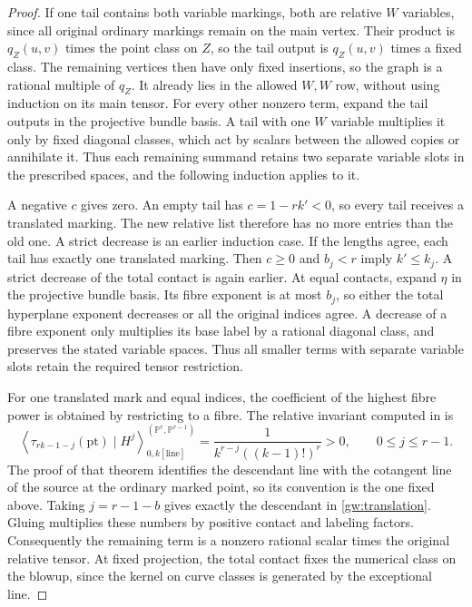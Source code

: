 \begin{proof}
If one tail contains both variable markings, both are relative $W$
variables, since all original ordinary markings remain on the main vertex.
Their product is $q_Z(u,v)$ times the point class on $Z$, so the tail output
is $q_Z(u,v)$ times a fixed class.  The remaining vertices then have only
fixed insertions, so the graph is a rational multiple of $q_Z$.  It already
lies in the allowed $W,W$ row, without using induction on its main tensor.
For every other nonzero term, expand the tail outputs in the projective
bundle basis.  A tail with one $W$ variable multiplies it only by fixed
diagonal classes, which act by scalars between the allowed copies or
annihilate it.  Thus each remaining summand retains two separate variable
slots in the prescribed spaces, and the following induction applies to it.

A negative $c$ gives zero.  An empty tail has $c=1-rk'<0$, so every tail
receives a translated marking.  The new relative list therefore has no
more entries than the old one.  A strict decrease is an earlier induction
case.  If the lengths agree, each tail has exactly one translated marking.
Then $c\geq0$ and $b_j<r$ imply $k'\leq k_j$.  A strict decrease of the
total contact is again earlier.  At equal contacts, expand $\eta$ in the
projective bundle basis.  Its fibre exponent is at most $b_j$, so either
the total hyperplane exponent decreases or all the original indices agree.
A decrease of a fibre exponent only multiplies its base label by a rational
diagonal class, and preserves the stated variable spaces.  Thus all smaller
terms with separate variable slots retain the required tensor
restriction.

For one translated mark and equal indices, the coefficient of the highest
fibre power is obtained by restricting to a fibre.  The relative invariant
computed in \cite[Theorem~7.1]{HLR08} is
\begin{equation}\label{gw:fibre-number}
\left\langle\tau_{rk-1-j}(\mathrm{pt})\mid H^j\right\rangle^%
 { (\mathbb P^r,\mathbb P^{r-1})}_{0,k[\mathrm{line}]}
 =\frac{1}{k^{r-j}((k-1)!)^r}>0,
 \qquad 0\leq j\leq r-1.
\end{equation}
The proof of that theorem identifies the descendant line with the
cotangent line of the source at the ordinary marked point, so its convention
is the one fixed above.  Taking $j=r-1-b$ gives exactly the descendant in
\eqref{gw:translation}.  Gluing multiplies these numbers by positive contact
and labeling factors.  Consequently the remaining term is a nonzero
rational scalar times the original relative tensor.  At fixed projection,
the total contact fixes the numerical class on the blowup, since the
kernel on curve classes is generated by the exceptional line.


\end{proof}

